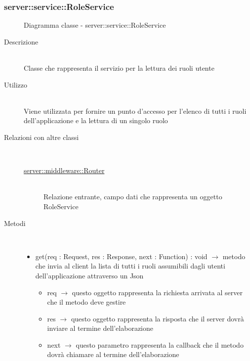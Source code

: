 \subsubsection[RoleService]{server::service::RoleService}
\begin{figure}[H]
	\centering
	\caption{Diagramma classe - server::service::RoleService}
\end{figure}\begin{description}
\item[Descrizione] \hfill \\
Classe che rappresenta il servizio per la lettura dei ruoli utente
\item[Utilizzo] \hfill \\
Viene utilizzata per fornire un punto d'accesso per l'elenco di tutti i ruoli dell'applicazione e la lettura di un singolo ruolo
\item[Relazioni con altre classi] \hfill \\
\vspace{-7mm}
\begin{description}
	\item[\hyperlink{server::middleware::Router}{server::middleware::Router}] \hfill \\
	Relazione entrante, campo dati che rappresenta un oggetto RoleService
\end{description}

\item[Metodi] \hfill \\
\vspace{-7mm}
\begin{itemize}
	\item get(req : Request, res : Response, next : Function) : void $\rightarrow$ metodo che invia al client la lista di tutti i ruoli assumibili dagli utenti dell'applicazione attraverso un Json\begin{itemize}
		\item req $\rightarrow$ questo oggetto rappresenta la richiesta arrivata al server che il metodo deve gestire
		\item res $\rightarrow$ questo oggetto rappresenta la risposta che il server dovrà inviare al termine dell'elaborazione
		\item next $\rightarrow$ questo parametro rappresenta la callback che il metodo dovrà chiamare al termine dell'elaborazione
	\end{itemize}
	

\end{itemize}
\end{description}
